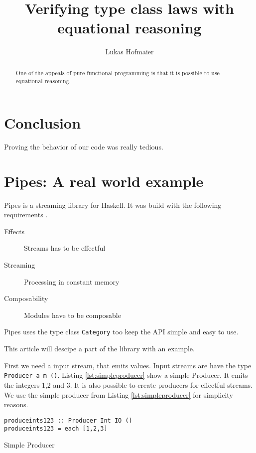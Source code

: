 \documentclass[twoside, a4paper]{article}
\author{Lukas Hofmaier}
\title{Verifying type class laws with equational reasoning}
\begin{document}
\maketitle
\tableofcontents

\begin{abstract}
One of the appeals of pure functional programming is that it is possible to use  equational  reasoning. 
\end{abstract}






\section{Conclusion}
\label{sec:conclusion}
Proving the behavior of our code was really tedious.

\section{Pipes: A real world example}
\label{sec:pipes}
Pipes is a streaming library for Haskell. It was build with the following requirements \cite{gonzales13}.
\begin{description}
\item[Effects] Streams has to be effectful
\item[Streaming] Processing in constant memory
\item[Composability] Modules have to be composable
\end{description}

Pipes uses the type class \verb|Category| too keep the API simple and easy to use.

This article will descipe a part of the library with an example.

First we need a input stream, that emits values. Input streams are have the type 
\verb|Producer a m ()|.
Listing \ref{lst:simpleproducer} show a simple Producer. It emits the integers 1,2 and 3. It is also possible to create producers for effectful streams. We use the simple producer from Listing \ref{lst:simpleproducer} for simplicity reasons.

\begin{program}
\begin{verbatim}
produceints123 :: Producer Int IO ()
produceints123 = each [1,2,3]
\end{verbatim}
\caption{Simple Producer}
\label{lst:simpleproducer}
\end{program}
\end{document}
